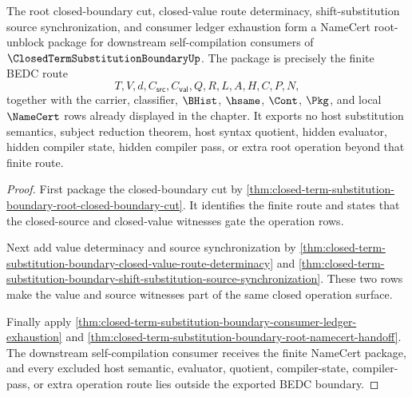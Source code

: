 \begin{theorem}
\label{thm:closed-term-substitution-boundary-namecert-root-unblock-package}
The root closed-boundary cut, closed-value route determinacy, shift-substitution source synchronization, and consumer ledger exhaustion form a NameCert root-unblock package for downstream self-compilation consumers of $\ClosedTermSubstitutionBoundaryUp$. The package is precisely the finite BEDC route
$$
T,V,d,C_{\mathsf{src}},C_{\mathsf{val}},Q,R,L,A,H,C,P,N,
$$
together with the carrier, classifier, $\BHist$, $\hsame$, $\Cont$, $\Pkg$, and local $\NameCert$ rows already displayed in the chapter. It exports no host substitution semantics, subject reduction theorem, host syntax quotient, hidden evaluator, hidden compiler state, hidden compiler pass, or extra root operation beyond that finite route.
\end{theorem}
\begin{proof}
First package the closed-boundary cut by \autoref{thm:closed-term-substitution-boundary-root-closed-boundary-cut}. It identifies the finite route and states that the closed-source and closed-value witnesses gate the operation rows.

Next add value determinacy and source synchronization by \autoref{thm:closed-term-substitution-boundary-closed-value-route-determinacy} and \autoref{thm:closed-term-substitution-boundary-shift-substitution-source-synchronization}. These two rows make the value and source witnesses part of the same closed operation surface.

Finally apply \autoref{thm:closed-term-substitution-boundary-consumer-ledger-exhaustion} and \autoref{thm:closed-term-substitution-boundary-root-namecert-handoff}. The downstream self-compilation consumer receives the finite NameCert package, and every excluded host semantic, evaluator, quotient, compiler-state, compiler-pass, or extra operation route lies outside the exported BEDC boundary.
\end{proof}

